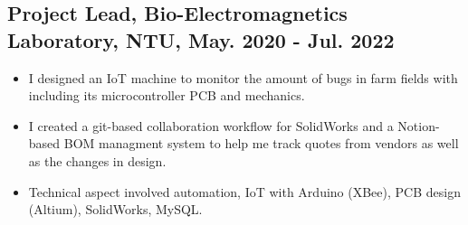 \documentclass[12pt]{article}
\begin{document}
        \subsection*{Project Lead, Bio-Electromagnetics Laboratory, NTU, May. 2020 - Jul. 2022}
        {\sffamily
        \begin{itemize}
            \item I designed an IoT machine to monitor the amount of bugs in farm fields with including its microcontroller PCB and mechanics.
            \item I created a git-based collaboration workflow for SolidWorks and a Notion-based BOM managment system to help me track quotes from vendors as well as the changes in design.
            \item Technical aspect involved automation, IoT with Arduino (XBee), PCB design (Altium), SolidWorks, MySQL.
        \end{itemize}
        }
        
        
\end{document}
